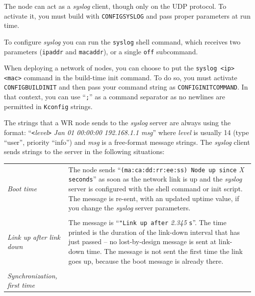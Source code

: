 \documentclass[a4paper, 12pt]{article}
\renewcommand{\_}{\underscore\allowbreak}
\begin{document}
\begin{sloppypar} %
The node can act as a \textit{syslog} client, though only on the UDP protocol.
To activate it, you must build with \texttt{CONFIG\_SYSLOG} and pass proper
parameters at run time.

To configure \textit{syslog} you can run the \texttt{syslog} shell command, which
receives two parameters (\texttt{ipaddr} and \texttt{macaddr}), or a
single \texttt{off} subcommand.

When deploying a network of nodes, you can choose to put the \texttt{syslog
<ip> <mac>} command in the build-time init command. To do so, you
must activate \texttt{CONFIG\_BUILD\_INIT} and then pass your command string
as \texttt{CONFIG\_INIT\_COMMAND}.  In that context, you can use ``\texttt{;}'' as
a command separator as no newlines are permitted in \texttt{Kconfig}
strings.

The strings that a WR node sends to the \textit{syslog} server are always
using the format:  ``\texttt{<}\textit{level}\texttt{>} \textit{Jan 01 00:00:00 192.168.1.1 msg}''
where \textit{level} is usually 14 (type ``user'', priority ``info'')
and \textit{msg} is a free-format message strings.
The \textit{syslog} client sends strings to the server in the following
situations:\\

\begin{longtable}{  p{6.5cm}  p{9cm} }

\textit{ Boot time } &

	The node sends ``\texttt{(ma:ca:dd:rr:ee:ss) Node up since} \textit{X}
        \texttt{seconds}'' as soon as the network link is up and the \textit{syslog}
        server is configured with the shell command or init script.
        The message is re-sent, with an updated uptime value, if you change
        the \textit{syslog} server parameters. \\
& \\
\textit{ Link up after link down } &

	The message is ``\texttt{"Link up after} \textit{2.345} \texttt{s}''. The
        time printed is the duration of the link-down interval that has just
        passed -- no lost-by-design message is sent at link-down time. The
        message is not sent the first time the link goes up, because
        the boot message is already there.\\
& \\
\textit{ Synchronization, first time } &


\end{longtable}
\end{sloppypar}
\end{document}
